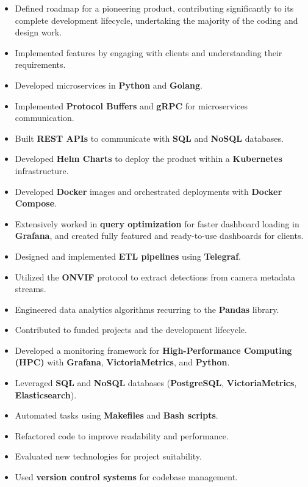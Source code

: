 \documentclass[10pt,a4paper,ragged2e,withhyper]{altacv}
\begin{document}
\begin{paracol}{2}



\begin{itemize}
\item Defined roadmap for a pioneering product, contributing significantly to its complete development lifecycle,  undertaking the majority of the coding and design work.
\item Implemented features by engaging with clients and understanding their requirements.
\item Developed microservices in \textbf{Python} and \textbf{Golang}.
\item Implemented \textbf{Protocol Buffers} and \textbf{gRPC} for microservices communication.
\item Built \textbf{REST APIs} to communicate with \textbf{SQL} and \textbf{NoSQL} databases.
\item Developed \textbf{Helm Charts} to deploy the product within a \textbf{Kubernetes} infrastructure.
\item Developed \textbf{Docker} images and orchestrated deployments with \textbf{Docker Compose}.
\item Extensively worked in \textbf{query optimization} for faster dashboard loading in \textbf{Grafana}, and created fully featured and ready-to-use dashboards for clients.
\item Designed and implemented \textbf{ETL pipelines} using \textbf{Telegraf}.
\item Utilized the \textbf{ONVIF} protocol to extract detections from camera metadata streams.
\item Engineered data analytics algorithms recurring to the \textbf{Pandas} library.
\end{itemize}
\bigskip


\begin{itemize}
      \item Contributed to funded projects and the development lifecycle.
      \item Developed a monitoring framework for \textbf{High-Performance Computing (HPC)}
            with \textbf{Grafana}, \textbf{VictoriaMetrics}, and \textbf{Python}.
      \item Leveraged \textbf{SQL} and \textbf{NoSQL} databases (\textbf{PostgreSQL},
            \textbf{VictoriaMetrics}, \textbf{Elasticsearch}).
      \item Automated tasks using \textbf{Makefiles} and \textbf{Bash scripts}.
      \item Refactored code to improve readability and performance.
      \item Evaluated new technologies for project suitability.
      \item Used \textbf{version control systems} for codebase management.
\end{itemize}




\end{paracol}
\end{document}
